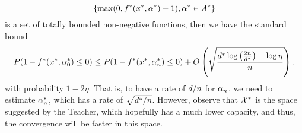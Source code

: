 $$\left\{\max(0, f^*(x^*, \alpha^*)- 1), \alpha^* \in A^*\right\}$$
 is a set of totally bounded non-negative functions, then we have the standard bound~\cite{Vapnik00}
\begin{equation}
    \nonumber
    P(1 - f^*(x^*, \alpha^*_0) \leq 0) \leq P(1 - f^*(x^*, \alpha^*_n) \leq 0) + O\left( \sqrt{\frac{d^* \log\left(\frac{2n}{d^*} \right) - \log\eta}{n}}  \right) .
\end{equation}
with probability $1 - 2\eta$.
That is, to have a rate of $d/n$ for $\alpha_n$, we need to estimate $\alpha^*_n$, which has a rate of $\sqrt{d^*/n}$. However, observe that $\mathcal{X}^*$ is the space suggested by the Teacher, which hopefully has a much lower capacity, and thus, the convergence will be faster in this space.

